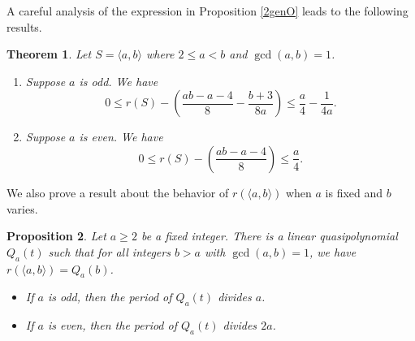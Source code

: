 \documentclass[12pt]{amsart}
\theoremstyle{plain}\newtheorem{proposition}{Proposition}[section]
\newtheorem{prop}[proposition]{Proposition}
\newtheorem{thm}[proposition]{Theorem}
\begin{document}
A careful analysis of the expression in Proposition \ref{2genO} leads to the following results.
\begin{thm}\label{thm:ord_e2}
Let $S = \langle a,b \rangle$ where $2\le a < b$ and $\gcd(a,b) = 1$.
\begin{enumerate}
\item Suppose $a$ is odd.  We have
\[
0 \le r(S) - \left( \frac{ab-a-4}{8} - \frac{b+3}{8a}\right) \le \frac{a}{4}-\frac{1}{4a}.
\]

\item Suppose $a$ is even.  We have
\[
0 \le r(S) - \left(\frac{ab-a-4}{8} \right)\le \frac{a}{4}.
\]
\end{enumerate}
\end{thm}

We also prove a result about the behavior of $r(\langle a,b\rangle)$ when $a$ is fixed and $b$ varies.
\begin{prop}\label{prop:ord_e2_quasi}
Let $a \ge 2$ be a fixed integer.  There is a linear quasipolynomial $Q_a(t)$ such that for all integers $b> a$ with $\gcd(a,b) = 1$, we have $r(\langle a,b\rangle) = Q_a(b)$.
\begin{itemize}
\item If $a$ is odd, then the period of $Q_a(t)$ divides $a$.
\item If $a$ is even, then the period of $Q_a(t)$ divides $2a$.
\end{itemize}
\end{prop}
\end{document}
